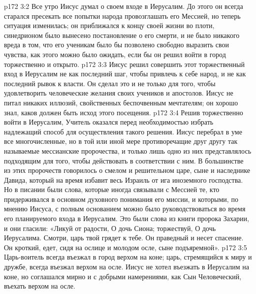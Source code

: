 \vs p172 3:2 Все утро Иисус думал о своем входе в Иерусалим. До этого он всегда старался пресекать все попытки народа провозглашать его Мессией, но теперь ситуация изменилась; он приближался к концу своей жизни во плоти, синедрионом было вынесено постановление о его смерти, и не было никакого вреда в том, что его ученикам было бы позволено свободно выразить свои чувства, как этого можно было ожидать, если бы он решил войти в город торжественно и открыто.
\vs p172 3:3 Иисус решил совершить этот торжественный вход в Иерусалим не как последний шаг, чтобы привлечь к себе народ, и не как последний рывок к власти. Он сделал это и не только для того, чтобы удовлетворить человеческие желания своих учеников и апостолов. Иисус не питал никаких иллюзий, свойственных беспочвенным мечтателям; он хорошо знал, каков должен быть исход этого посещения.
\vs p172 3:4 Решив торжественно войти в Иерусалим, Учитель оказался перед необходимостью избрать надлежащий способ для осуществления такого решения. Иисус перебрал в уме все многочисленные, но в той или иной мере противоречащие друг другу так называемые мессианские пророчества, и только лишь одно из них представлялось подходящим для того, чтобы действовать в соответствии с ним. В большинстве из этих пророчеств говорилось о смелом и решительном царе, сыне и наследнике Давида, который на время избавит весь Израиль от ига иноземного господства. Но в писании были слова, которые иногда связывали с Мессией те, кто придерживался в основном духовного понимания его миссии, и которыми, по мнению Иисуса, с полным основанием можно было руководствоваться во время его планируемого входа в Иерусалим. Это были слова из книги пророка Захарии, и они гласили: «Ликуй от радости, О дочь Сиона; торжествуй, О дочь Иерусалима. Смотри, царь твой грядет к тебе. Он праведный и несет спасение. Он кроткий, едет, сидя на ослице и молодом осле, сыне подъяремной».
\vs p172 3:5 \pc Царь\hyp{}воитель всегда въезжал в город верхом на коне; царь, стремящийся к миру и дружбе, всегда въезжал верхом на осле. Иисус не хотел въезжать в Иерусалим на коне, но соглашался мирно и с добрыми намерениями, как Сын Человеческий, въехать верхом на осле.
